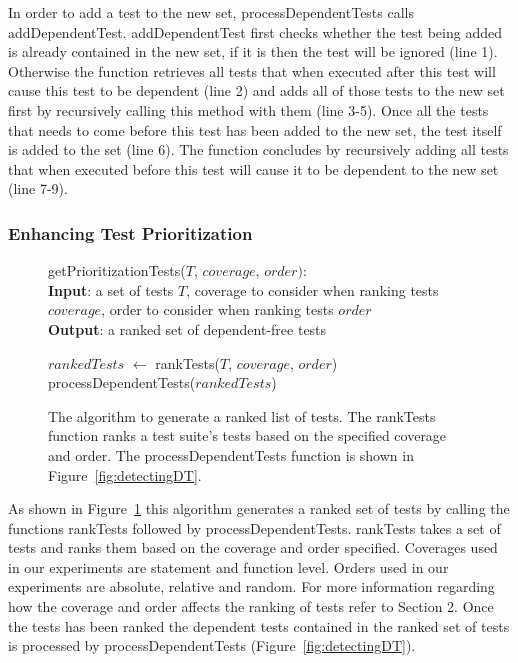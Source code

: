 In order to add a test to the new set, processDependentTests calls addDependentTest. addDependentTest first checks whether the test being added is already contained in the new set, if it is then the test will be ignored (line 1). Otherwise the function retrieves all tests that when executed after this test will cause this test to be dependent (line 2) and adds all of those tests to the new set first by recursively calling this method with them (line 3-5). Once all the tests that needs to come before this test has been added to the new set, the test itself is added to the set (line 6). The function concludes by recursively adding all tests that when executed before this test will cause it to be dependent to the new set (line 7-9).     

\subsubsection{Enhancing Test Prioritization}
\begin{figure}[t]
	getPrioritizationTests($\mathit{T}$, $\mathit{coverage}$, $\mathit{order}):$\\
	\textbf{Input}: a set of tests $\mathit{T}$, coverage to consider when ranking tests $\mathit{coverage}$, order to consider when ranking tests $\mathit{order}$\\
	\textbf{Output}: a ranked set of dependent-free tests\\
	 \begin{algorithmic}[1]
	 	\vspace{-5mm}
		\STATE $\mathit{rankedTests}$ $\leftarrow$ rankTests($\mathit{T}$, $\mathit{coverage}$, $\mathit{order}$)
		\RETURN processDependentTests($\mathit{rankedTests}$)
	\end{algorithmic}
	\vspace{-3mm}
	\caption {
		The algorithm to generate a ranked list of tests. The rankTests function ranks a test suite's tests based on the specified coverage and order. The processDependentTests function is shown in Figure~\ref{fig:detectingDT}.
	}
	\label{fig:prioritization}
\end{figure}
As shown in Figure~\ref{fig:prioritization} this algorithm generates a ranked set of tests by calling the functions rankTests followed by processDependentTests. rankTests takes a set of tests and ranks them based on the coverage and order specified. Coverages used in our experiments are statement and function level. Orders used in our experiments are absolute, relative and random. For more information regarding how the coverage and order affects the ranking of tests refer to Section 2. Once the tests has been ranked the dependent tests contained in the ranked set of tests is processed by processDependentTests (Figure~\ref{fig:detectingDT}).

